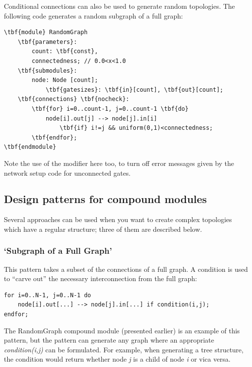 Conditional connections can also be used to generate random
topologies.  The following code generates a
random subgraph of a full graph:

\begin{Verbatim}[commandchars=\\\{\}]
\tbf{module} RandomGraph
    \tbf{parameters}:
        count: \tbf{const},
        connectedness; // 0.0<x<1.0
    \tbf{submodules}:
        node: Node [count];
            \tbf{gatesizes}: \tbf{in}[count], \tbf{out}[count];
    \tbf{connections} \tbf{nocheck}:
        \tbf{for} i=0..count-1, j=0..count-1 \tbf{do}
            node[i].out[j] --> node[j].in[i]
                \tbf{if} i!=j && uniform(0,1)<connectedness;
        \tbf{endfor};
\tbf{endmodule}
\end{Verbatim}

Note the use of the  modifier
here too, to turn off error messages given by the network setup code
for unconnected gates.


\subsection{Design patterns for compound modules}


Several approaches can be used when you want to create complex
topologies which have a regular structure; three of them are
described below.


\subsubsection{`Subgraph of a Full Graph'}


This pattern takes a subset of the connections of a full graph.  A
condition is used to ``carve out'' the necessary interconnection from
the full graph:

\begin{Verbatim}[commandchars=\\\{\}]
for i=0..N-1, j=0..N-1 do
    node[i].out[...] --> node[j].in[...] if condition(i,j);
endfor;
\end{Verbatim}

The RandomGraph compound module (presented earlier) is an example of
this pattern, but the pattern can generate any graph where an
appropriate \textit{condition(i,j)} can be formulated. For example,
when generating a tree structure, the condition
would return whether node \textit{j} is a child of node \textit{i} or
vica versa.

